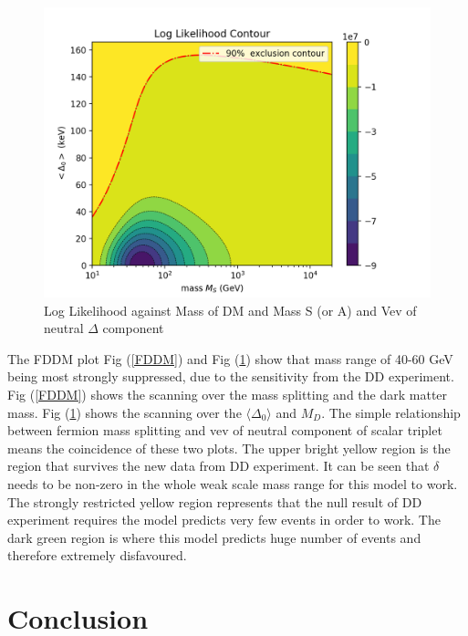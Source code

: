 \documentclass[12pt]{article}
\begin{document}
\begin{figure}
\includegraphics{figure_4.png}
\caption{Log Likelihood against Mass of DM and Mass S (or A) and Vev of neutral $\Delta$ component} \label{FDDMpara}
\end{figure}




The FDDM plot Fig (\ref{FDDM}) and Fig (\ref{FDDMpara}) show that mass range of 40-60 GeV being most strongly suppressed, due to the sensitivity from the DD experiment. Fig (\ref{FDDM}) shows the scanning over the mass splitting and the dark matter mass.  Fig (\ref{FDDMpara}) shows the scanning over the $\langle \Delta_0 \rangle$ and $M_D$. The simple relationship between fermion mass splitting and vev of neutral component of scalar triplet means the coincidence of these two plots. The upper bright yellow region is the region that survives the new data from DD experiment. It can be seen that $\delta$ needs to be non-zero in the whole weak scale mass range for this model to work. The strongly restricted yellow region represents that the null result of DD experiment requires the model predicts very few events in order to work. The dark green region is where this model predicts huge number of events and therefore extremely disfavoured. 


\section{Conclusion}
\end{document}
